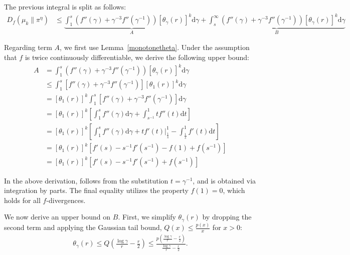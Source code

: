 \documentclass[10pt, journal]{IEEEtran}
\makeatletter
\def\eqref#1{equation~\ref{#1}}
\renewcommand{\eqref}[1]{\textup{\tagform@{\ref{#1}}}}
\makeatother
\begin{document}
The previous integral is split as follows:
\begin{align}
    D_{f}(\mu_{k} \| \pi^\eta) &\le \underbrace{\int_1^{s} \left( f''(\gamma) + \gamma^{-3}f''(\gamma^{-1})\right)\left[\theta_{\gamma}\left(r\right)\right]^{k} \mathrm{d}\!\gamma}_{A} + \underbrace{\int_s^{\infty} \left(f''(\gamma) + \gamma^{-3}f''(\gamma^{-1})\right)\left[\theta_{\gamma}\left(r\right)\right]^{k} \!\!\mathrm{d}\!\gamma}_{B}\nonumber
\end{align}

Regarding term $A$, we first use Lemma~\ref{monotonetheta}. Under the assumption that $f$ is twice continuously differentiable, we derive the following upper bound:
\begin{align}
    A &= \int_1^{s} \left( f''(\gamma) + \gamma^{-3}f''(\gamma^{-1})\right)\left[\theta_{\gamma}\left(r\right)\right]^{k} \mathrm{d}\!\gamma \nonumber\\
    &\le \int_1^{s} \left[ f''(\gamma) + \gamma^{-3}f''(\gamma^{-1})\right]\left[\theta_{1}\left(r\right)\right]^{k}\mathrm{d}\!\gamma \nonumber\\
    &= \left[\theta_{1}\left(r\right)\right]^{k} \int_1^{s} \left[f''(\gamma) + \gamma^{-3}f''(\gamma^{-1})\right] \mathrm{d}\!\gamma \nonumber\\
    &= \left[\theta_{1}\left(r\right)\right]^{k}\left[ \int_1^{s} \!\!\!f''(\gamma)\mathrm{d}\!\gamma + \int_{s^{-1}}^{1} tf''(t)\mathrm{d}t\right] \label{eq:substitution}\\
    &= \left[\theta_{1}\left(r\right)\right]^{k}\left[\int_1^{s} \!\!\!f''(\gamma)\mathrm{d}\!\gamma + tf'(t)\Big|_{\frac{1}{s}}^1 - \int_{\tfrac{1}{s}}^1 \!\!\!f'(t)\mathrm{d}t\right] \label{eq:ibp}\\
    &= \left[\theta_{1}\left(r\right)\right]^{k} \left[f'(s) - s^{-1}f'(s^{-1}) - f(1) + f(s^{-1}) \right] \nonumber\\
    &= \left[\theta_{1}\left(r\right)\right]^{k} \left[f'(s) - s^{-1}f'(s^{-1}) + f(s^{-1}) \right] \label{eq:final_bound}
\end{align}

In the above derivation, \eqref{eq:substitution} follows from the substitution $t = \gamma^{-1}$, and \eqref{eq:ibp} is obtained via integration by parts. The final equality \eqref{eq:final_bound} utilizes the property $f(1) = 0$, which holds for all $f$-divergences.


We now derive an upper bound on $B$. First, we simplify $\theta_\gamma(r)$ by dropping the second term and applying the Gaussian tail bound, $Q(x) \le \frac{p(x)}{x}$ for $x > 0$:
\begin{align*}
\theta_\gamma(r) \le Q\left(\tfrac{\log \gamma}{r} - \tfrac{r}{2}\right) \le \frac{p\left(\frac{\log \gamma}{r} - \frac{r}{2}\right)}{\frac{\log \gamma}{r} - \frac{r}{2}}.
\end{align*}
\end{document}
